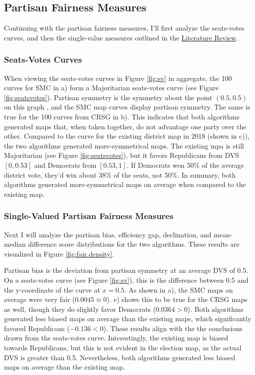\subsection{Partisan Fairness Measures}

Continuing with the partisan fairness measures, I'll first analyze the seats-votes curves, and then the single-value measures outlined in the \hyperref[sec:litreview]{Literature Review}. 

\subsubsection{Seats-Votes Curves}

When viewing the seats-votes curves in Figure \ref{fig:sv} in aggregate, the 100 curves for SMC in a) form a Majoritarian seats-votes curve (see Figure \ref{fig:seatsvotes}). Partisan symmetry is the symmetry about the point $(0.5, 0.5)$ on this graph \parencite{katz2020}, and the SMC map curves display partisan symmetry. The same is true for the 100 curves from CRSG in b). This indicates that both algorithms generated maps that, when taken together, do not advantage one party over the other. Compared to the curve for the existing district map in 2018 (shown in c)), the two algorithms generated more-symmetrical maps. The existing mpa is still Majoritarian (see Figure \ref{fig:seatsvotes}), but it favors Republicans from DVS $[0, 0.53]$ and Democrats from $[0.53, 1]$. If Democrats won 50\% of the average district vote, they'd win about 38\% of the seats, not 50\%. In summary, both algorithms generated more-symmetrical maps on average when compared to the existing map. 

\subsubsection{Single-Valued Partisan Fairness Measures}

Next I will analyze the partisan bias, efficiency gap, declination, and mean-median difference score distributions for the two algorithms. These results are visualized in Figure \ref{fig:fair.density}.

Partisan bias is the deviation from partisan symmetry at an average DVS of 0.5. On a seats-votes curve (see Figure \ref{fig:sv}), this is the difference between 0.5 and the y-coordinate of the curve at $x=0.5$. As shown in a), the SMC maps on average were very fair ($0.0045 \approx 0$). e) shows this to be true for the CRSG maps as well, though they do slightly favor Democrats ($0.0364 > 0$). Both algorithms generated less biased maps on average than the existing maps, which significantly favored Republicans ($-0.136 < 0$). These results align with the the conclusions drawn from the seats-votes curve. Interestingly, the existing map is biased towards Republicans, but this is not evident in the election map, as the actual DVS is greater than 0.5. Nevertheless, both algorithms generated less biased maps on average than the existing map. 

